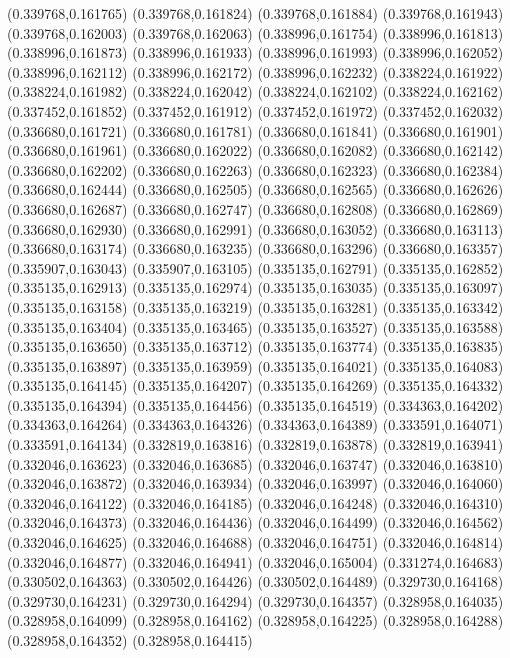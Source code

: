 (0.339768,0.161765)
(0.339768,0.161824)
(0.339768,0.161884)
(0.339768,0.161943)
(0.339768,0.162003)
(0.339768,0.162063)
(0.338996,0.161754)
(0.338996,0.161813)
(0.338996,0.161873)
(0.338996,0.161933)
(0.338996,0.161993)
(0.338996,0.162052)
(0.338996,0.162112)
(0.338996,0.162172)
(0.338996,0.162232)
(0.338224,0.161922)
(0.338224,0.161982)
(0.338224,0.162042)
(0.338224,0.162102)
(0.338224,0.162162)
(0.337452,0.161852)
(0.337452,0.161912)
(0.337452,0.161972)
(0.337452,0.162032)
(0.336680,0.161721)
(0.336680,0.161781)
(0.336680,0.161841)
(0.336680,0.161901)
(0.336680,0.161961)
(0.336680,0.162022)
(0.336680,0.162082)
(0.336680,0.162142)
(0.336680,0.162202)
(0.336680,0.162263)
(0.336680,0.162323)
(0.336680,0.162384)
(0.336680,0.162444)
(0.336680,0.162505)
(0.336680,0.162565)
(0.336680,0.162626)
(0.336680,0.162687)
(0.336680,0.162747)
(0.336680,0.162808)
(0.336680,0.162869)
(0.336680,0.162930)
(0.336680,0.162991)
(0.336680,0.163052)
(0.336680,0.163113)
(0.336680,0.163174)
(0.336680,0.163235)
(0.336680,0.163296)
(0.336680,0.163357)
(0.335907,0.163043)
(0.335907,0.163105)
(0.335135,0.162791)
(0.335135,0.162852)
(0.335135,0.162913)
(0.335135,0.162974)
(0.335135,0.163035)
(0.335135,0.163097)
(0.335135,0.163158)
(0.335135,0.163219)
(0.335135,0.163281)
(0.335135,0.163342)
(0.335135,0.163404)
(0.335135,0.163465)
(0.335135,0.163527)
(0.335135,0.163588)
(0.335135,0.163650)
(0.335135,0.163712)
(0.335135,0.163774)
(0.335135,0.163835)
(0.335135,0.163897)
(0.335135,0.163959)
(0.335135,0.164021)
(0.335135,0.164083)
(0.335135,0.164145)
(0.335135,0.164207)
(0.335135,0.164269)
(0.335135,0.164332)
(0.335135,0.164394)
(0.335135,0.164456)
(0.335135,0.164519)
(0.334363,0.164202)
(0.334363,0.164264)
(0.334363,0.164326)
(0.334363,0.164389)
(0.333591,0.164071)
(0.333591,0.164134)
(0.332819,0.163816)
(0.332819,0.163878)
(0.332819,0.163941)
(0.332046,0.163623)
(0.332046,0.163685)
(0.332046,0.163747)
(0.332046,0.163810)
(0.332046,0.163872)
(0.332046,0.163934)
(0.332046,0.163997)
(0.332046,0.164060)
(0.332046,0.164122)
(0.332046,0.164185)
(0.332046,0.164248)
(0.332046,0.164310)
(0.332046,0.164373)
(0.332046,0.164436)
(0.332046,0.164499)
(0.332046,0.164562)
(0.332046,0.164625)
(0.332046,0.164688)
(0.332046,0.164751)
(0.332046,0.164814)
(0.332046,0.164877)
(0.332046,0.164941)
(0.332046,0.165004)
(0.331274,0.164683)
(0.330502,0.164363)
(0.330502,0.164426)
(0.330502,0.164489)
(0.329730,0.164168)
(0.329730,0.164231)
(0.329730,0.164294)
(0.329730,0.164357)
(0.328958,0.164035)
(0.328958,0.164099)
(0.328958,0.164162)
(0.328958,0.164225)
(0.328958,0.164288)
(0.328958,0.164352)
(0.328958,0.164415)
